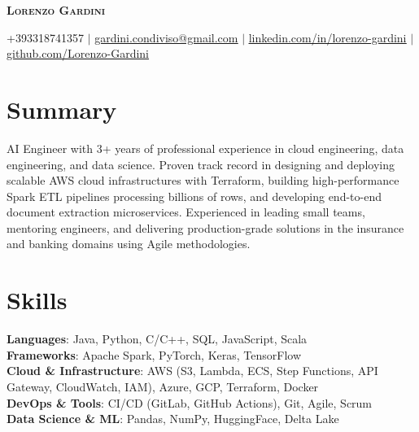 \documentclass[letterpaper,11pt]{article}
\begin{document}
\begin{center}
    \textbf{\Huge \scshape Lorenzo Gardini} \\ \vspace{1pt}

    \vspace{0.5em}

    \small +393318741357 $|$ \href{mailto:gardini.condiviso@gmail.com}{\underline{gardini.condiviso@gmail.com}} $|$ 
    \href{https://www.linkedin.com/in/lorenzo-gardini/}{\underline{linkedin.com/in/lorenzo-gardini}} $|$
    \href{https://github.com/Lorenzo-Gardini}{\underline{github.com/Lorenzo-Gardini}}
\end{center}

\section{Summary}
 \begin{itemize}[leftmargin=0.15in, label={}]
    \small{\item{
     AI Engineer with 3+ years of professional experience in cloud engineering, data engineering, and data science. Proven track record in designing and deploying scalable AWS cloud infrastructures with Terraform, building high-performance Spark ETL pipelines processing billions of rows, and developing end-to-end document extraction microservices. Experienced in leading small teams, mentoring engineers, and delivering production-grade solutions in the insurance and banking domains using Agile methodologies.
    }}
 \end{itemize}

%
\section{Skills}
 \begin{itemize}[leftmargin=0.15in, label={}]
    \small{\item{
     \textbf{Languages}{: Java, Python, C/C++, SQL, JavaScript, Scala} \\
     \textbf{Frameworks}{: Apache Spark, PyTorch, Keras, TensorFlow} \\
     \textbf{Cloud \& Infrastructure}{: AWS (S3, Lambda, ECS, Step Functions, API Gateway, CloudWatch, IAM), Azure, GCP, Terraform, Docker} \\
     \textbf{DevOps \& Tools}{: CI/CD (GitLab, GitHub Actions), Git, Agile, Scrum} \\
     \textbf{Data Science \& ML}{: Pandas, NumPy, HuggingFace, Delta Lake}
    }}
 \end{itemize}
\end{document}
